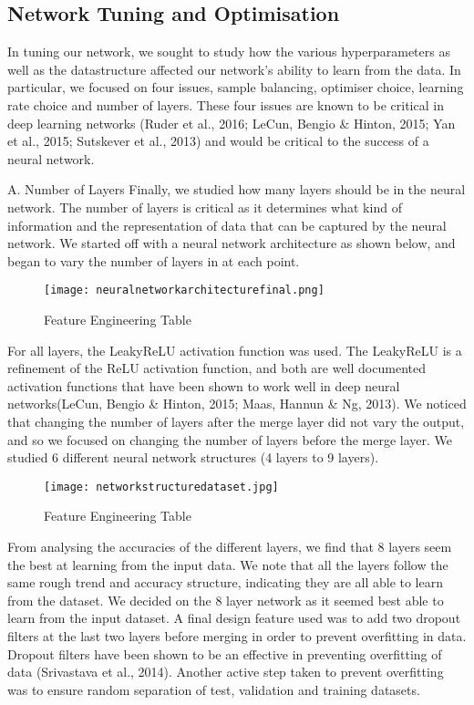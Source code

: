 \documentclass{article}
\begin{document}
\subsection{Network Tuning and Optimisation}


In tuning our network, we sought to study how the various hyperparameters as well as the datastructure affected our network's ability to learn from the data. In particular, we focused on four issues, sample balancing, optimiser choice, learning rate choice and number of layers. These four issues are known to be critical in deep learning networks (Ruder et al., 2016; LeCun, Bengio \& Hinton, 2015; Yan et al., 2015;  Sutskever et al., 2013) and would be critical to the success of a neural network.

A. Number of Layers 
Finally, we studied how many layers should be in the neural network. The number of layers is critical as it determines what kind of information and the representation of data that can be captured by the neural network. We started off with a neural network architecture as shown below, and began to vary the number of layers in at each point.

\begin{figure}[H]
\caption{Feature Engineering Table}
\texttt{[image: neuralnetworkarchitecturefinal.png]}
\centering
\end{figure}

For all layers, the LeakyReLU activation function was used. The LeakyReLU is a refinement of the ReLU activation function, and both are well documented activation functions that have been shown to work well in deep neural networks(LeCun, Bengio \& Hinton, 2015; Maas, Hannun \& Ng, 2013). We noticed that changing the number of layers after the merge layer did not vary the output, and so we focused on changing the number of layers before the merge layer. We studied 6 different neural network structures (4 layers to 9 layers). 

\begin{figure}[H]
\caption{Feature Engineering Table}
\texttt{[image: networkstructuredataset.jpg]}
\centering
\end{figure}

From analysing the accuracies of the different layers, we find that 8 layers seem the best at learning from the input data. We note that all the layers follow the same rough trend and accuracy structure, indicating they are all able to learn from the dataset. We decided on the 8 layer network as it seemed best able to learn from the input dataset. A final design feature used was to add two dropout filters at the last two layers before merging in order to prevent overfitting in data. Dropout filters have been shown to be an effective in preventing overfitting of data (Srivastava et al., 2014). Another active step taken to prevent overfitting was to ensure random separation of test, validation and training datasets.
\end{document}
